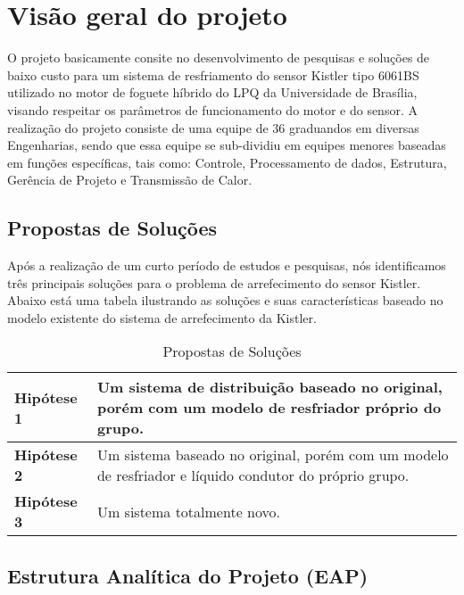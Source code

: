 \chapter{Visão geral do projeto}
    
    O projeto basicamente consite no desenvolvimento de pesquisas e soluções de baixo custo para um sistema de 
    resfriamento do sensor Kistler tipo 6061BS utilizado no motor de foguete híbrido do LPQ da 
    Universidade de Brasília, visando respeitar os parâmetros de funcionamento do motor e do sensor.
    A realização do projeto consiste de uma equipe de 36 graduandos em diversas Engenharias, sendo que
    essa equipe se sub-dividiu em equipes menores baseadas em funções específicas, tais como: Controle, Processamento
    de dados, Estrutura, Gerência de Projeto e Transmissão de Calor.

\section{Propostas de Soluções}

    Após a realização de um curto período de estudos e pesquisas, nós identificamos três principais
    soluções para o problema de arrefecimento do sensor Kistler. Abaixo está uma tabela ilustrando as
    soluções e suas características baseado no modelo existente do sistema de arrefecimento da Kistler.

    \begin{table}[!htb]
        \centering
        \begin{tabular}{p{5cm}p{10cm}}
          \toprule
          \textbf{Hipótese 1}  &     Um sistema de distribuição baseado no original, 
                                    porém com um modelo de resfriador próprio do grupo.                             \\ \midrule
          \textbf{Hipótese 2} &     Um sistema baseado no original, 
                                    porém com um modelo de resfriador e líquido condutor do próprio grupo.   \\ \midrule
          \textbf{Hipótese 3} &     Um sistema totalmente novo.                      \\
          \bottomrule
        \end{tabular}
        \caption{Propostas de Soluções}
      \end{table}

\section{Estrutura Analítica do Projeto (EAP)}